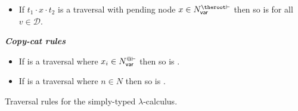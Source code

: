 \begin{FramedTable}
\begin{itemize}[]
\item {} If $t_1
\cdot x \cdot t_2$ is a traversal with pending node $x \in
N_{\sf var}^{\theroot\vdash}$ then so is  for all $v \in
\mathcal{D}$.
\end{itemize}

\emph{\bf Copy-cat rules}
\begin{itemize}[]
\item{}
If  is a traversal where $x_i \in
    N_{\sf var}^{@\vdash}$ then so is .

\item{}
  If  is a traversal where $n\in N$ then so is
.
\end{itemize}
\caption[Traversal rules for the simply-typed
lambda-calculus]{Traversal rules for the simply-typed
$\lambda$-calculus.} \label{tab:trav_rules}
\end{FramedTable}
